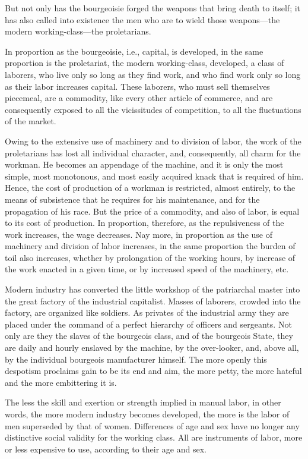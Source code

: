 But not only has the bourgeoisie forged the weapons that bring death to itself; it has also called into existence the men who are to wield those weapons—the modern working-class—the proletarians.

In proportion as the bourgeoisie, i.e., capital, is developed, in the same proportion is the proletariat, the modern working-class, developed, a class of laborers, who live only so long as they find work, and who find work only so long as their labor increases capital. These laborers, who must sell themselves piecemeal, are a commodity, like every other article of commerce, and are consequently exposed to all the vicissitudes of competition, to all the fluctuations of the market.

Owing to the extensive use of machinery and to division of labor, the work of the proletarians has lost all individual character, and, consequently, all charm for the workman. He becomes an appendage of the machine, and it is only the most simple, most monotonous, and most easily acquired knack that is required of him. Hence, the cost of production of a workman is restricted, almost entirely, to the means of subsistence that he requires for his maintenance, and for the propagation of his race. But the price of a commodity, and also of labor, is equal to its cost of production. In proportion, therefore, as the repulsiveness of the work increases, the wage decreases. Nay more, in proportion as the use of machinery and division of labor increases, in the same proportion the burden of toil also increases, whether by prolongation of the working hours, by increase of the work enacted in a given time, or by increased speed of the machinery, etc.

Modern industry has converted the little workshop of the patriarchal master into the great factory of the industrial capitalist. Masses of laborers, crowded into the factory, are organized like soldiers. As privates of the industrial army they are placed under the command of a perfect hierarchy of officers and sergeants. Not only are they the slaves of the bourgeois class, and of the bourgeois State, they are daily and hourly enslaved by the machine, by the over-looker, and, above all, by the individual bourgeois manufacturer himself. The more openly this despotism proclaims gain to be its end and aim, the more petty, the more hateful and the more embittering it is.

The less the skill and exertion or strength implied in manual labor, in other words, the more modern industry becomes developed, the more is the labor of men superseded by that of women. Differences of age and sex have no longer any distinctive social validity for the working class. All are instruments of labor, more or less expensive to use, according to their age and sex.


